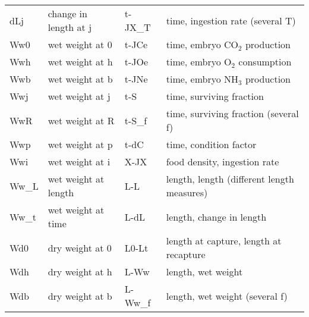 \begin{table}
\begin{tabular}{ll|ll}
dLj & change in length at j & t-JX\_T & time, ingestion rate (several T)\\ 
Ww0 & wet weight at 0 & t-JCe & time, embryo CO$_2$ production\\ 
Wwh & wet weight at h & t-JOe & time, embryo O$_2$ consumption\\ 
Wwb & wet weight at b & t-JNe & time, embryo NH$_3$ production\\ 
Wwj & wet weight at j & t-S & time, surviving fraction\\ 
WwR & wet weight at R & t-S\_f & time, surviving fraction (several f)\\ 
Wwp & wet weight at p & t-dC & time, condition factor\\ 
Wwi & wet weight at i & X-JX & food density, ingestion rate\\ 
Ww\_L & wet weight at length & L-L & length, length (different length measures)\\ 
Ww\_t & wet weight at time & L-dL & length, change in length\\ 
Wd0 & dry weight at 0 & L0-Lt & length at capture, length at recapture\\ 
Wdh & dry weight at h & L-Ww & length, wet weight\\ 
Wdb & dry weight at b & L-Ww\_f & length, wet weight (several f)\\ 
\hline
\end{tabular}
\end{table}

